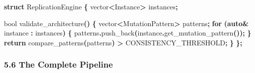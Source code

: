 \documentclass[
  11pt,
  a4paper,
]{article}
\newenvironment{Shaded}{\begin{snugshade}}{\end{snugshade}}
\newcommand{\ControlFlowTok}[1]{\textcolor[rgb]{0.13,0.29,0.53}{\textbf{#1}}}
\newcommand{\DataTypeTok}[1]{\textcolor[rgb]{0.13,0.29,0.53}{#1}}
\newcommand{\KeywordTok}[1]{\textcolor[rgb]{0.13,0.29,0.53}{\textbf{#1}}}
\newcommand{\NormalTok}[1]{#1}
\newcommand{\OperatorTok}[1]{\textcolor[rgb]{0.81,0.36,0.00}{\textbf{#1}}}
\begin{document}
\begin{Shaded}
\begin{Highlighting}[]
\KeywordTok{struct}\NormalTok{ ReplicationEngine }\OperatorTok{\{}
\NormalTok{    vector}\OperatorTok{\textless{}}\NormalTok{Instance}\OperatorTok{\textgreater{}}\NormalTok{ instances}\OperatorTok{;}
    
    \DataTypeTok{bool}\NormalTok{ validate\_architecture}\OperatorTok{()} \OperatorTok{\{}
\NormalTok{        vector}\OperatorTok{\textless{}}\NormalTok{MutationPattern}\OperatorTok{\textgreater{}}\NormalTok{ patterns}\OperatorTok{;}
        \ControlFlowTok{for} \OperatorTok{(}\KeywordTok{auto}\OperatorTok{\&}\NormalTok{ instance }\OperatorTok{:}\NormalTok{ instances}\OperatorTok{)} \OperatorTok{\{}
\NormalTok{            patterns}\OperatorTok{.}\NormalTok{push\_back}\OperatorTok{(}\NormalTok{instance}\OperatorTok{.}\NormalTok{get\_mutation\_pattern}\OperatorTok{());}
        \OperatorTok{\}}
        \ControlFlowTok{return}\NormalTok{ compare\_patterns}\OperatorTok{(}\NormalTok{patterns}\OperatorTok{)} \OperatorTok{\textgreater{}}\NormalTok{ CONSISTENCY\_THRESHOLD}\OperatorTok{;}
    \OperatorTok{\}}
\OperatorTok{\};}
\end{Highlighting}
\end{Shaded}

\subsubsection{5.6 The Complete Pipeline}\label{the-complete-pipeline}
\end{document}
